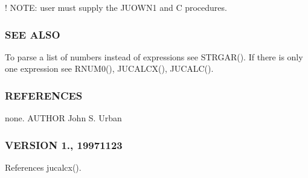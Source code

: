 \begin{DoxyVerb}
   ! NOTE: user must supply the JUOWN1 and C procedures.
\end{DoxyVerb}


\subsubsection*{S\+EE A\+L\+SO}

To parse a list of numbers instead of expressions see S\+T\+R\+G\+A\+R(). If there is only one expression see R\+N\+U\+M0(), J\+U\+C\+A\+L\+C\+X(), J\+U\+C\+A\+L\+C().

\subsubsection*{R\+E\+F\+E\+R\+E\+N\+C\+ES}

none. A\+U\+T\+H\+OR John S. Urban \subsubsection*{V\+E\+R\+S\+I\+ON 1., 19971123}

References jucalcx().

